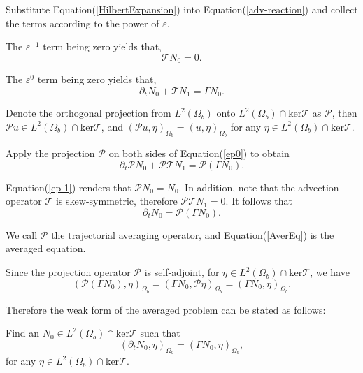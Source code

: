 \documentclass{article}
\numberwithin{equation}{section}
\begin{document}
Substitute Equation(\ref{HilbertExpansion}) into Equation(\ref{adv-reaction}) and collect the terms according to the power of $\varepsilon$.

The $\varepsilon^{-1}$ term being zero yields that,
\begin{equation}\label{ep-1}
    \mathcal{T}N_{0}=0.
\end{equation}

The $\varepsilon^{0}$ term being zero yields that,
\begin{equation}\label{ep0}
    \partial_{t}N_{0}+\mathcal{T}N_{1}=\Gamma N_{0}.
\end{equation}


Denote the orthogonal projection from $L^{2}(\Omega_{b})$ onto $L^{2}(\Omega_{b}) \cap \text{ker} \mathcal{T}$ as $\mathcal{P}$, then $\mathcal{P}u \in L^{2}(\Omega_{b}) \cap \text{ker}\mathcal{T}$, and $\left(\mathcal{P}u,\eta\right)_{\Omega_{b}}=\left(u,\eta\right)_{\Omega_{b}}$ for any $\eta \in L^{2}(\Omega_{b}) \cap \text{ker} \mathcal{T}$.

Apply the projection $\mathcal{P}$ on both sides of Equation(\ref{ep0}) to obtain
\begin{equation*}
    \partial_{t}\mathcal{P}N_{0}+\mathcal{P}\mathcal{T}N_{1}=\mathcal{P}\left(\Gamma N_{0}\right).
\end{equation*}


Equation(\ref{ep-1}) renders that $\mathcal{P}N_{0} = N_{0}$. In addition, note that the advection operator $\mathcal{T}$ is skew-symmetric, therefore $\mathcal{P}\mathcal{T}N_{1} = 0$. It follows that
\begin{equation}\label{AverEq}
    \partial_{t}N_{0}=\mathcal{P}\left(\Gamma N_{0}\right).
\end{equation}

We call $\mathcal{P}$ the trajectorial averaging operator, and Equation(\ref{AverEq}) is the averaged equation. 


Since the projection operator $\mathcal{P}$ is self-adjoint, for $\eta \in L^{2}(\Omega_{b}) \cap \text{ker} \mathcal{T}$, we have
\begin{equation*}
    \left(\mathcal{P}\left(\Gamma N_{0}\right),\eta\right)_{\Omega_{b}}=\left(\Gamma N_{0},\mathcal{P}\eta\right)_{\Omega_{b}}=\left(\Gamma N_{0},\eta\right)_{\Omega_{b}}.
\end{equation*}

Therefore the weak form of the averaged problem can be stated as follows:

Find an $N_{0} \in  L^{2}(\Omega_{b}) \cap \text{ker} \mathcal{T}$ such that 
\begin{equation}\label{weakAverEq}
    \left(\partial_{t}N_{0},\eta\right)_{\Omega_{b}}=\left(\Gamma N_{0},\eta\right)_{\Omega_{b}},
\end{equation}
for any $\eta \in L^{2}(\Omega_{b}) \cap \text{ker} \mathcal{T}$.
\end{document}
